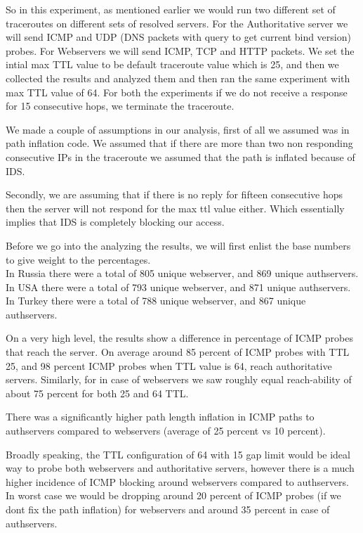 So in this experiment, as mentioned earlier we would run two different set of traceroutes on different sets of resolved servers. For the Authoritative server we will send ICMP and UDP (DNS packets with query to get current bind version) probes. For Webservers we will send ICMP, TCP and HTTP packets. We set the intial max TTL value to be default traceroute value which is 25, and then we collected the results and analyzed them and then ran the same experiment with max TTL value of 64. For both the experiments if we do not receive a response for 15 consecutive hops, we terminate the traceroute.

We made a couple of assumptions in our analysis, first of all we assumed was in path inflation code. We assumed that if there are more than two non responding consecutive IPs in the traceroute we assumed that the path is inflated because of IDS. 

Secondly, we are assuming that if there is no reply for fifteen consecutive hops then the server will not respond for the max ttl value either. Which essentially implies that IDS is completely blocking our access.

Before we go into the analyzing the results, we will first enlist the base numbers to give weight to the percentages. \\

In Russia there were a total of 805 unique webserver, and 869 unique authservers.
In USA there were a total of 793 unique webserver, and 871 unique authservers.
In Turkey there were a total of 788 unique webserver, and 867 unique authservers.


On a very high level, the results show a difference in percentage of ICMP probes that reach the server. On average around 85 percent of ICMP probes with TTL 25, and 98 percent ICMP probes when TTL value is 64, reach authoritative servers. Similarly, for in case of webservers we saw roughly equal reach-ability of about 75 percent for both 25 and 64 TTL. 

There was a significantly higher path length inflation in ICMP paths to authservers compared to webservers (average of 25 percent vs 10 percent). 

Broadly speaking, the TTL configuration of 64 with 15 gap limit would be ideal way to probe both webservers and authoritative servers, however there is a much higher incidence of ICMP blocking around webservers compared to authservers. In worst case we would be dropping around 20 percent of ICMP probes (if we dont fix the path inflation) for webservers and around 35 percent in case of authservers.

